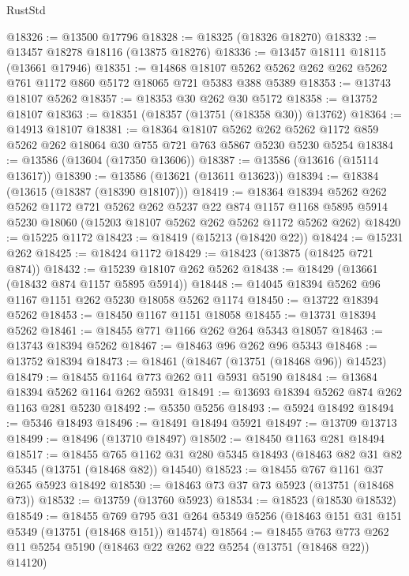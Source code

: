 \begin{lexlean}{RustStd}
\begin{coremodule}
@18326 := @13500 @17796
@18328 := @18325 (@18326 @18270)
@18332 := @13457 @18278 @18116 (@13875 @18276)
@18336 := @13457 @18111 @18115 (@13661 @17946)
@18351 := @14868
    @18107
    @5262
    @5262
    @262
    @262
    @5262
    @761
    @1172
    @860
    @5172
    @18065
    @721
    @5383
    @388
    @5389
@18353 := @13743 @18107 @5262
@18357 := @18353 @30 @262 @30 @5172
@18358 := @13752 @18107
@18363 := @18351 (@18357 (@13751 (@18358 @30)) @13762)
@18364 := @14913 @18107
@18381 := @18364
    @18107
    @5262
    @262
    @5262
    @1172
    @859
    @5262
    @262
    @18064
    @30
    @755
    @721
    @763
    @5867
    @5230
    @5230
    @5254
@18384 := @13586 (@13604 (@17350 @13606))
@18387 := @13586 (@13616 (@15114 @13617))
@18390 := @13586 (@13621 (@13611 @13623))
@18394 := @18384 (@13615 (@18387 (@18390 @18107)))
@18419 := @18364
    @18394
    @5262
    @262
    @5262
    @1172
    @721
    @5262
    @262
    @5237
    @22
    @874
    @1157
    @1168
    @5895
    @5914
    @5230
    @18060
    (@15203 @18107 @5262 @262 @5262 @1172 @5262 @262)
@18420 := @15225 @1172
@18423 := @18419 (@15213 (@18420 @22))
@18424 := @15231 @262
@18425 := @18424 @1172
@18429 := @18423 (@13875 (@18425 @721 @874))
@18432 := @15239 @18107 @262 @5262
@18438 := @18429 (@13661 (@18432 @874 @1157 @5895 @5914))
@18448 := @14045 @18394 @5262 @96 @1167 @1151 @262 @5230 @18058 @5262 @1174
@18450 := @13722 @18394 @5262
@18453 := @18450 @1167 @1151 @18058
@18455 := @13731 @18394 @5262
@18461 := @18455 @771 @1166 @262 @264 @5343 @18057
@18463 := @13743 @18394 @5262
@18467 := @18463 @96 @262 @96 @5343
@18468 := @13752 @18394
@18473 := @18461 (@18467 (@13751 (@18468 @96)) @14523)
@18479 := @18455 @1164 @773 @262 @11 @5931 @5190
@18484 := @13684 @18394 @5262 @1164 @262 @5931
@18491 := @13693 @18394 @5262 @874 @262 @1163 @281 @5230
@18492 := @5350 @5256
@18493 := @5924 @18492
@18494 := @5346 @18493
@18496 := @18491 @18494 @5921
@18497 := @13709 @13713
@18499 := @18496 (@13710 @18497)
@18502 := @18450 @1163 @281 @18494
@18517 := @18455
    @765
    @1162
    @31
    @280
    @5345
    @18493
    (@18463 @82 @31 @82 @5345 (@13751 (@18468 @82)) @14540)
@18523 := @18455 @767 @1161 @37 @265 @5923 @18492
@18530 := @18463 @73 @37 @73 @5923 (@13751 (@18468 @73))
@18532 := @13759 (@13760 @5923)
@18534 := @18523 (@18530 @18532)
@18549 := @18455
    @769
    @795
    @31
    @264
    @5349
    @5256
    (@18463 @151 @31 @151 @5349 (@13751 (@18468 @151)) @14574)
@18564 := @18455
    @763
    @773
    @262
    @11
    @5254
    @5190
    (@18463 @22 @262 @22 @5254 (@13751 (@18468 @22)) @14120)

\end{coremodule}
\end{lexlean}
